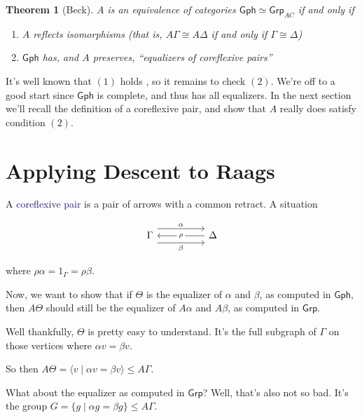 \documentclass[12pt]{article}
\newtheorem{thm}{Theorem}
\theoremstyle{definition}
\theoremstyle{theorem}
\newcommand*{\catFont}[1]{\mathsf{#1}}
\newcommand{\Grp}{\catFont{Grp}}
\newcommand*{\important}[1]{\textcolor{MidnightBlue}{#1}}
\begin{document}
\begin{thm}[Beck]
    $A$ is an equivalence of categories $\mathsf{Gph} \simeq \Grp_{AC}$ 
    if and only if

    \begin{enumerate}
        \item $A$ reflects isomorphisms (that is, $A\Gamma \cong A\Delta$ if and only if $\Gamma \cong \Delta$)
        \item $\mathsf{Gph}$ has, and $A$ preserves, ``equalizers of coreflexive pairs''
    \end{enumerate}
\end{thm}

It's well known that $(1)$ holds 
, so it remains to check $(2)$. We're off to a good start since $\mathsf{Gph}$
is complete, and thus has all equalizers. In the next section we'll recall
the definition of a coreflexive pair, and show that $A$ really does satisfy
condition $(2)$.

\section{Applying Descent to Raags}
\label{proof}

A \important{coreflexive pair} is a pair of arrows with a common retract. 
A situation

\[\begin{tikzcd}
	\Gamma && \Delta
	\arrow["\alpha", shift left=3, from=1-1, to=1-3]
	\arrow["\beta"', shift right=3, from=1-1, to=1-3]
	\arrow["\rho"{description}, from=1-3, to=1-1]
\end{tikzcd}\]

where $\rho \alpha = 1_\Gamma = \rho \beta$.

Now, we want to show that if $\Theta$ is the equalizer of $\alpha$ and $\beta$,
as computed in $\mathsf{Gph}$, 
then $A\Theta$ should still be the equalizer of $A \alpha$ and $A \beta$, 
as computed in $\mathsf{Grp}$.

Well thankfully, $\Theta$ is pretty easy to understand. It's the full subgraph
of $\Gamma$ on those vertices where $\alpha v = \beta v$.

So then $A\Theta = \langle v \mid \alpha v = \beta v \rangle \leq A \Gamma$.

What about the equalizer as computed in $\mathsf{Grp}$? Well, that's also not
so bad. It's the group $G = \{ g \mid \alpha g = \beta g \} \leq A\Gamma$.
\end{document}
